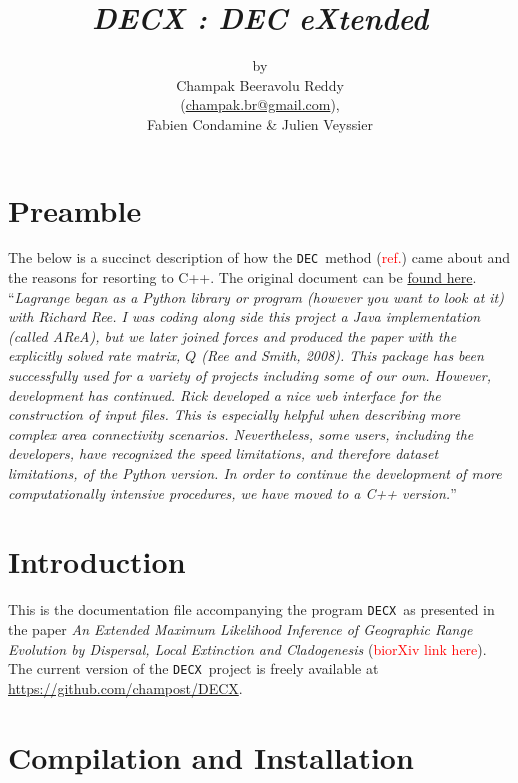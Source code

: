 \documentclass[12pt,a4]{article}
\title{\textit{DECX : DEC eXtended}}
\author{\vspace{0.5cm}by\\
Champak Beeravolu Reddy \\
\vspace{0.2cm}(\url{champak.br@gmail.com}),\\
\vspace{0.5cm}Fabien Condamine \& Julien Veyssier}
\newcommand{\DECX}{\texttt{DECX}}
\newcommand{\DEC}{\texttt{DEC}}
\begin{document}
\maketitle

\tableofcontents

\clearpage

\section{Preamble}

The below is a succinct description of how the \DEC\ method (\textcolor{red}{ref.}) came about and the reasons for resorting to C++. The original document can be \href{https://github.com/blackrim/lagrange/blob/master/manual.pdf}{found here}.\\

\textquotedblleft\textit{Lagrange began as a Python library or program (however you want to look at it) with Richard Ree. I was coding along side this project a Java implementation (called AReA), but we later joined forces and produced the paper with the explicitly solved rate matrix, $ Q $ (Ree and Smith, 2008). This package has been successfully used for a variety of projects including some of our own. However, development has continued. Rick developed a nice web interface for the construction of input files. This is especially helpful when describing more complex area connectivity scenarios. Nevertheless, some users, including the developers, have recognized the speed limitations, and therefore dataset limitations, of the Python version. In order to continue the development of more computationally intensive procedures, we have moved to a C++ version.}\textquotedblright


\section{Introduction}
This is the documentation file accompanying the program \DECX\ as presented in the paper \textit{An Extended Maximum Likelihood Inference of Geographic Range Evolution by Dispersal, Local Extinction and Cladogenesis} (\textcolor{red}{biorXiv link here}). The current version of the \DECX\ project is freely available at \url{https://github.com/champost/DECX}. 

\section{Compilation and Installation}
\end{document}
